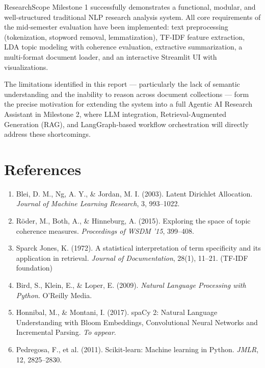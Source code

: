 \documentclass[12pt, a4paper]{article}
\begin{document}
ResearchScope Milestone 1 successfully demonstrates a functional, modular, and well-structured traditional NLP research analysis system. All core requirements of the mid-semester evaluation have been implemented: text preprocessing (tokenization, stopword removal, lemmatization), TF-IDF feature extraction, LDA topic modeling with coherence evaluation, extractive summarization, a multi-format document loader, and an interactive Streamlit UI with visualizations.

The limitations identified in this report — particularly the lack of semantic understanding and the inability to reason across document collections — form the precise motivation for extending the system into a full Agentic AI Research Assistant in Milestone 2, where LLM integration, Retrieval-Augmented Generation (RAG), and LangGraph-based workflow orchestration will directly address these shortcomings.

\section*{References}

\begin{enumerate}
  \item Blei, D. M., Ng, A. Y., \& Jordan, M. I. (2003). Latent Dirichlet Allocation. \textit{Journal of Machine Learning Research}, 3, 993--1022.
  \item Röder, M., Both, A., \& Hinneburg, A. (2015). Exploring the space of topic coherence measures. \textit{Proceedings of WSDM '15}, 399--408.
  \item Sparck Jones, K. (1972). A statistical interpretation of term specificity and its application in retrieval. \textit{Journal of Documentation}, 28(1), 11--21. (TF-IDF foundation)
  \item Bird, S., Klein, E., \& Loper, E. (2009). \textit{Natural Language Processing with Python}. O'Reilly Media.
  \item Honnibal, M., \& Montani, I. (2017). spaCy 2: Natural Language Understanding with Bloom Embeddings, Convolutional Neural Networks and Incremental Parsing. \textit{To appear}.
  \item Pedregosa, F., et al. (2011). Scikit-learn: Machine learning in Python. \textit{JMLR}, 12, 2825--2830.
\end{enumerate}
\end{document}
